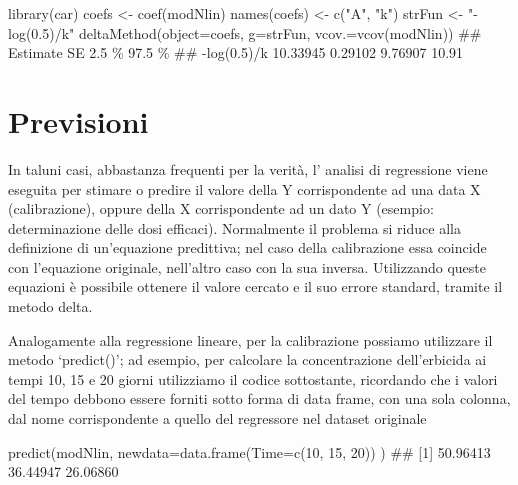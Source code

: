 \documentclass[a4paper,12pt,oneside]{book}
\newenvironment{Shaded}{\begin{snugshade}}{\end{snugshade}}
\newcommand{\DecValTok}[1]{#1}
\newcommand{\StringTok}[1]{#1}
\newcommand{\DocumentationTok}[1]{#1}
\newcommand{\OtherTok}[1]{#1}
\newcommand{\FunctionTok}[1]{#1}
\newcommand{\AttributeTok}[1]{#1}
\newcommand{\NormalTok}[1]{#1}
\begin{document}
\begin{Shaded}
\begin{Highlighting}[]
\FunctionTok{library}\NormalTok{(car)}
\NormalTok{coefs }\OtherTok{\textless{}{-}} \FunctionTok{coef}\NormalTok{(modNlin) }
\FunctionTok{names}\NormalTok{(coefs) }\OtherTok{\textless{}{-}} \FunctionTok{c}\NormalTok{(}\StringTok{"A"}\NormalTok{, }\StringTok{"k"}\NormalTok{)}
\NormalTok{strFun }\OtherTok{\textless{}{-}} \StringTok{"{-}log(0.5)/k"}
\FunctionTok{deltaMethod}\NormalTok{(}\AttributeTok{object=}\NormalTok{coefs, }\AttributeTok{g=}\NormalTok{strFun, }\AttributeTok{vcov.=}\FunctionTok{vcov}\NormalTok{(modNlin))}
\DocumentationTok{\#\#             Estimate       SE    2.5 \% 97.5 \%}
\DocumentationTok{\#\# {-}log(0.5)/k 10.33945  0.29102  9.76907  10.91}
\end{Highlighting}
\end{Shaded}

\hypertarget{previsioni-1}{%
\section{Previsioni}\label{previsioni-1}}

In taluni casi, abbastanza frequenti per la verità, l' analisi di regressione viene eseguita per stimare o predire il valore della Y corrispondente ad una data X (calibrazione), oppure della X corrispondente ad un dato Y (esempio: determinazione delle dosi efficaci). Normalmente il problema si riduce alla definizione di un'equazione predittiva; nel caso della calibrazione essa coincide con l'equazione originale, nell'altro caso con la sua inversa. Utilizzando queste equazioni è possibile ottenere il valore cercato e il suo errore standard, tramite il metodo delta.

Analogamente alla regressione lineare, per la calibrazione possiamo utilizzare il metodo `predict()'; ad esempio, per calcolare la concentrazione dell'erbicida ai tempi 10, 15 e 20 giorni utilizziamo il codice sottostante, ricordando che i valori del tempo debbono essere forniti sotto forma di data frame, con una sola colonna, dal nome corrispondente a quello del regressore nel dataset originale

\begin{Shaded}
\begin{Highlighting}[]
\FunctionTok{predict}\NormalTok{(modNlin, }\AttributeTok{newdata=}\FunctionTok{data.frame}\NormalTok{(}\AttributeTok{Time=}\FunctionTok{c}\NormalTok{(}\DecValTok{10}\NormalTok{, }\DecValTok{15}\NormalTok{, }\DecValTok{20}\NormalTok{)) )}
\DocumentationTok{\#\# [1] 50.96413 36.44947 26.06860}
\end{Highlighting}
\end{Shaded}
\end{document}
